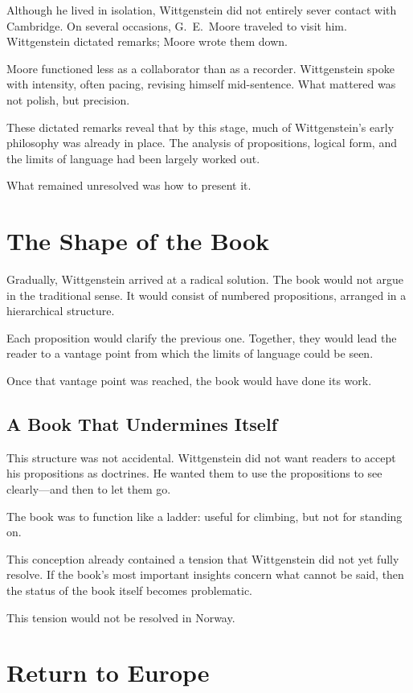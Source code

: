 \documentclass[11pt]{article}
\begin{document}
Although he lived in isolation, Wittgenstein did not entirely sever contact with Cambridge. On several occasions, G.\ E.\ Moore traveled to visit him. Wittgenstein dictated remarks; Moore wrote them down.

Moore functioned less as a collaborator than as a recorder. Wittgenstein spoke with intensity, often pacing, revising himself mid-sentence. What mattered was not polish, but precision.

These dictated remarks reveal that by this stage, much of Wittgenstein’s early philosophy was already in place. The analysis of propositions, logical form, and the limits of language had been largely worked out.

What remained unresolved was how to present it.

\section*{The Shape of the Book}

Gradually, Wittgenstein arrived at a radical solution. The book would not argue in the traditional sense. It would consist of numbered propositions, arranged in a hierarchical structure.

Each proposition would clarify the previous one. Together, they would lead the reader to a vantage point from which the limits of language could be seen.

Once that vantage point was reached, the book would have done its work.

\subsection*{A Book That Undermines Itself}

This structure was not accidental. Wittgenstein did not want readers to accept his propositions as doctrines. He wanted them to use the propositions to see clearly—and then to let them go.

The book was to function like a ladder: useful for climbing, but not for standing on.

This conception already contained a tension that Wittgenstein did not yet fully resolve. If the book’s most important insights concern what cannot be said, then the status of the book itself becomes problematic.

This tension would not be resolved in Norway.

\section*{Return to Europe}
\end{document}
